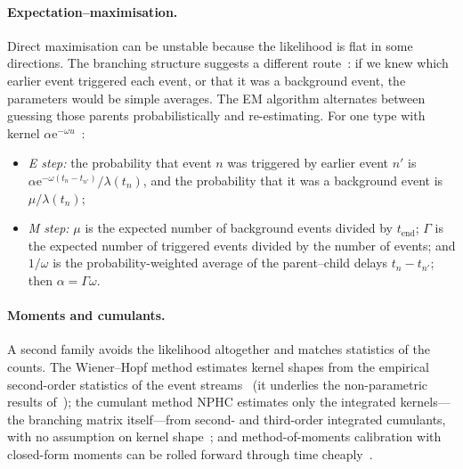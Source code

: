 \paragraph{Expectation--maximisation.} Direct maximisation can be unstable because the likelihood is
flat in some directions. The branching structure suggests a different route~\citep{veen2008em}: if we
knew which earlier event triggered each event, or that it was a background event, the parameters would
be simple averages. The EM algorithm alternates between guessing those parents probabilistically and
re-estimating. For one type with kernel $\alpha\mathrm{e}^{-\omega u}$~\citep{lewis2011em}:
\begin{itemize}[leftmargin=1.5em,itemsep=1pt]
\item \emph{E step:} the probability that event $n$ was triggered by earlier event $n'$ is
  $\alpha\mathrm{e}^{-\omega (t_n - t_{n'})}/\lambda(t_n)$, and the probability that it was a background
  event is $\mu/\lambda(t_n)$;
\item \emph{M step:} $\mu$ is the expected number of background events divided by $t_{\text{end}}$; $\Gamma$ is the
  expected number of triggered events divided by the number of events; and $1/\omega$ is the
  probability-weighted average of the parent--child delays $t_n - t_{n'}$; then $\alpha = \Gamma\omega$.
\end{itemize}

\paragraph{Moments and cumulants.} A second family avoids the likelihood altogether and matches
statistics of the counts. The Wiener--Hopf method estimates kernel shapes from the empirical
second-order statistics of the event streams~\citep{bacrymuzy2016wh} (it underlies the non-parametric
results of~\citet{bacry2016}); the cumulant method NPHC estimates only the integrated kernels---the
branching matrix itself---from second- and third-order integrated cumulants, with no assumption on
kernel shape~\citep{achab2018cumulants}; and method-of-moments calibration with closed-form moments
can be rolled forward through time cheaply~\citep{dafonseca2014}.

